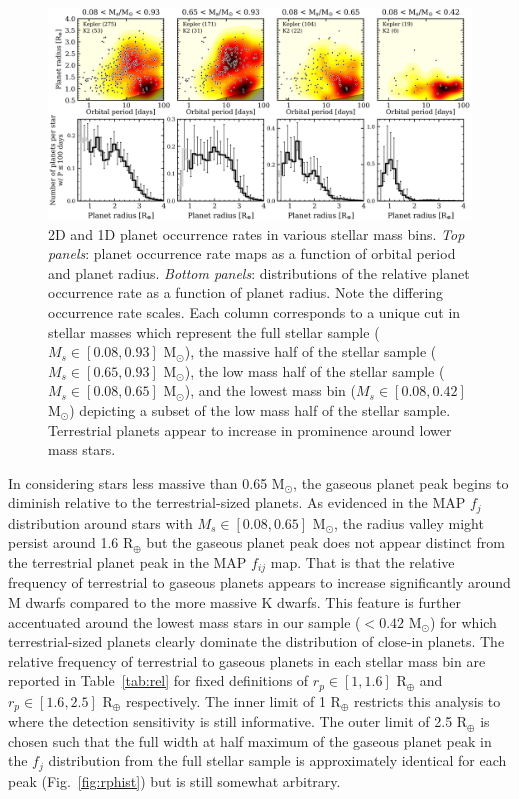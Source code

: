 \documentclass[twocolumn]{emulateapj}
\begin{document}
\begin{figure}
  \centering
  \includegraphics[width=.98\hsize]{figures/rphist_compMs.png}
  \caption{2D and 1D planet occurrence rates in various stellar mass bins. \emph{Top panels}: planet occurrence
    rate maps as a function of orbital period and planet radius. \emph{Bottom panels}: distributions of the relative
    planet occurrence rate as a function of planet radius. Note the differing occurrence rate scales.
    Each column corresponds to a unique cut in stellar masses
    which represent the full stellar sample ($M_s \in [0.08,0.93]$ M$_{\odot}$), the massive half of the stellar sample
    ($M_s \in [0.65,0.93]$ M$_{\odot}$), the low mass half of the stellar sample ($M_s \in [0.08,0.65]$ M$_{\odot}$),
    and the lowest mass bin ($M_s \in [0.08,0.42]$ M$_{\odot}$) depicting a subset of the low mass half of the stellar
    sample. Terrestrial planets appear to increase in prominence around lower mass stars.}
  \label{fig:rphistcomp}
\end{figure}

In considering stars less massive than 0.65 M$_{\odot}$, the gaseous planet peak begins to diminish relative
to the terrestrial-sized planets. As evidenced in the MAP $f_j$ distribution around stars with
$M_s \in [0.08,0.65]$ M$_{\odot}$, the radius valley might persist around 1.6 R$_{\oplus}$ but the gaseous planet
peak does not appear distinct from the terrestrial planet peak in the MAP $f_{ij}$ map. That is that the relative
frequency of terrestrial to gaseous planets appears to increase significantly around M dwarfs compared to the more
massive K dwarfs. This feature is further accentuated around the lowest mass stars in our sample ($<0.42$
M$_{\odot}$) for which terrestrial-sized planets clearly dominate the distribution of close-in planets. The relative
frequency of terrestrial to gaseous planets in each stellar mass bin are reported in Table~\ref{tab:rel}
for fixed definitions of $r_p \in [1,1.6]$ R$_{\oplus}$ and $r_p \in [1.6,2.5]$ R$_{\oplus}$ respectively. The inner
limit of 1 R$_{\oplus}$ restricts this analysis to where the detection sensitivity is still informative. The outer
limit of 2.5 R$_{\oplus}$ is chosen such that the full width at half maximum of the gaseous planet peak in the
$f_j$ distribution from the full stellar sample is approximately identical for each peak (Fig.~\ref{fig:rphist})
but is still somewhat arbitrary.
\end{document}

